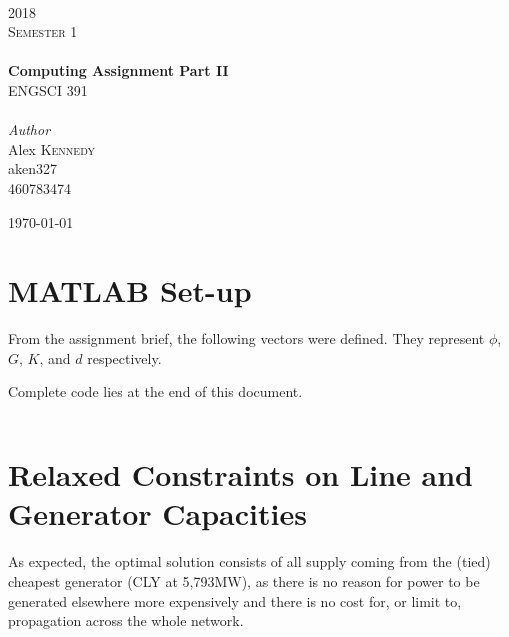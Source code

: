 \documentclass[11pt]{article}
\begin{document}
\begin{titlepage}
	\newcommand{\HRule}{\rule{\linewidth}{0.5mm}} %

	\center


	\textsc{\LARGE }\\[1.5cm]
	\textsc{\Large 2018}\\[0.5cm]
	\textsc{\large Semester 1}\\[1cm]

	{
	}\\[0.4cm]

	{\huge\bfseries Computing Assignment Part II}\\[0.6cm]
	{\large ENGSCI 391}\\[1cm]

	{
	}\\[1cm]

	{\large\textit{Author}}\\
	Alex \textsc{Kennedy\\[1cm]}
	aken327\\
	460783474

	\vfill\vfill\vfill
	{\large\today}
	\vfill

\end{titlepage}

\section*{MATLAB Set-up}

From the assignment brief, the following vectors were defined. They represent $\phi$, $G$, $K$, and $d$ respectively. 

Complete code lies at the end of this document.

\inputminted[firstline=1, lastline=4]{matlab}{main.m}

\section*{Relaxed Constraints on Line and Generator Capacities}
As expected, the optimal solution consists of all supply coming from the (tied) cheapest generator (CLY at 5,793MW), as there is no reason for power to be generated elsewhere more expensively and there is no cost for, or limit to, propagation across the whole network. 
\end{document}
